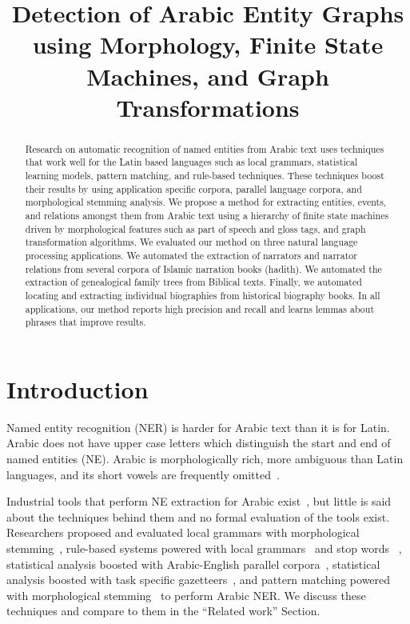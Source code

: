 \documentclass{llncs}
\title{Detection of Arabic Entity Graphs using Morphology, Finite State Machines, and Graph Transformations}
\date{}
\begin{document}
\maketitle

\begin{abstract}
Research on automatic recognition of named entities
from Arabic text uses techniques that work well for the 
Latin based languages such as local grammars, 
statistical learning models, pattern matching, 
and rule-based techniques. 
These techniques boost their results by using application 
specific 
corpora, parallel language corpora,
and morphological stemming analysis. 
We propose a method for extracting entities, events, 
and relations amongst them
from Arabic text using 
a hierarchy of finite state machines driven by morphological 
features such as part of speech and gloss tags,
and graph transformation algorithms. 
We evaluated our method on three natural language processing 
applications.
We automated the extraction of narrators and 
narrator relations from 
several corpora of Islamic narration books (hadith). 
We automated the extraction of genealogical family trees 
from Biblical texts. 
Finally, we automated locating and extracting
individual biographies from historical biography books.
In all applications, our method reports high precision and recall
and learns lemmas about phrases that improve results. 
\end{abstract}


\section{Introduction}
Named entity recognition (NER) is harder for Arabic text than 
it is for Latin. 
Arabic does not have upper case letters which distinguish the 
start and end of named entities (NE).
Arabic is morphologically rich, 
more ambiguous than Latin languages,
and its short vowels are frequently omitted~\cite{Debili1998}.

Industrial tools that perform NE extraction for Arabic exist~\cite{Sak09,IdentiFinder,basis:06,ANEE:07},
but little is said about the techniques behind them and no formal evaluation of the tools exist. 
Researchers proposed and evaluated 
local grammars with morphological stemming~\cite{ZAGHOUANI10,Traboulsi:09},
rule-based systems powered with local grammars~\cite{ShaalanR09} 
and stop words ~\cite{Abuleil04},
statistical analysis boosted with Arabic-English parallel corpora~\cite{BenajibaZDR10}, 
statistical analysis boosted with task specific gazetteers~\cite{ANERSys:07,BenajibaDR08},
and pattern matching powered with morphological stemming~\cite{jumaily2011,TAGARAB98}
to perform Arabic NER.
We discuss these techniques and compare to them in 
the ``Related work'' Section.
\end{document}
